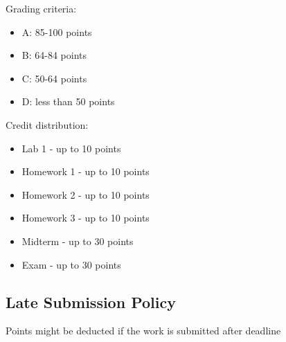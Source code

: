Grading criteria:
\begin{itemize}
    \item A: 85-100 points
    \item B: 64-84 points
    \item C: 50-64 points
    \item D: less than 50 points
\end{itemize}

Credit distribution:
\begin{itemize}
    \item Lab 1 - up to 10 points
    \item Homework 1 - up to 10 points
    \item Homework 2 - up to 10 points
    \item Homework 3 - up to 10 points
    \item Midterm - up to 30 points
    \item Exam - up to 30 points
\end{itemize}

\subsection{Late Submission Policy}
Points might be deducted if the work is submitted after deadline
